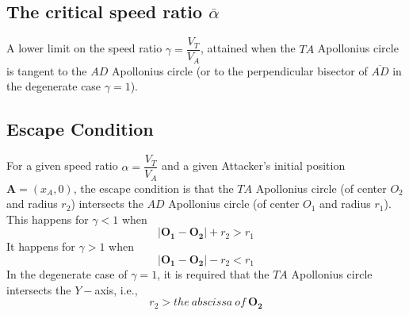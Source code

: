 \subsection{The critical speed ratio $\overline{\alpha}$}
A lower limit on the speed ratio $\gamma=\dfrac{V_{T}}{V_{A}}$, attained when the $TA$ Apollonius circle is tangent to the $AD$ Apollonius circle (or to the perpendicular bisector of $\overline{AD}$ in the degenerate case $\gamma=1$).   

\subsection{Escape Condition}
For a given speed ratio $\alpha=\dfrac{V_{T}}{V_{A}}$ and a given Attacker's initial position $\boldsymbol{A}=(x_{A},0)$, the escape condition is that the $TA$ Apollonius circle (of center $O_2$ and radius $r_2$) intersects the $AD$ Apollonius circle (of center $O_1$ and radius $r_1$). This happens for $\gamma<1$ when
\begin{equation}
\lvert \boldsymbol{O_{1}}-\boldsymbol{O_{2}}\rvert+r_{2}>r_{1}
\end{equation}
It happens for $\gamma>1$ when
\begin{equation}
\lvert \boldsymbol{O_{1}}-\boldsymbol{O_{2}}\rvert-r_{2}<r_{1}
\end{equation}
In the degenerate case of $\gamma=1$, it is required that the $TA$ Apollonius circle intersects the $Y-$axis, i.e., 
\begin{equation}
r_{2}>the\ abscissa\ of\ \boldsymbol{O_{2}}
\end{equation}
